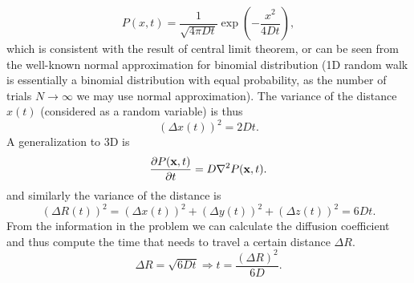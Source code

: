 \documentclass[10pt]{article}
\begin{document}
\begin{equation}
	P(x,t) = \frac{1}{\sqrt{4\pi D t}} \exp(-\frac{x^2}{4 D t}),
\end{equation}
which is consistent with the result of central limit theorem, or can be seen from the well-known normal approximation for binomial distribution (1D random walk is essentially a binomial distribution with equal probability, as the number of trials $N \to \infty$ we may use normal approximation). The variance of the distance $x(t)$ (considered as a random variable) is thus 
\begin{equation}
	(\Delta x(t))^2 = 2Dt.
\end{equation}
A generalization to 3D is 
\begin{equation}
	\pdv{P(\vb{x},t)}{t} = D \laplacian{P(\vb{x},t)}.
\end{equation}
and similarly the variance of the distance is 
\begin{equation}
	(\Delta R(t))^2 = (\Delta x(t))^2 + (\Delta y(t))^2 + (\Delta z(t))^2 = 6Dt.
\end{equation}
From the information in the problem we can calculate the diffusion coefficient and thus compute the time that needs to travel a certain distance $\Delta R$. 
\begin{equation}
	\Delta R = \sqrt{6Dt} \Longrightarrow t = \frac{(\Delta R)^2}{6D}.
\end{equation}
\end{document}
